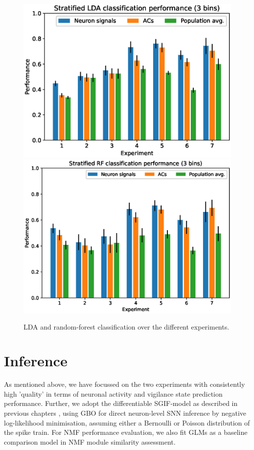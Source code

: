 \documentclass[mphil,deptreport,ianc]{infthesis} %
\begin{document}
\begin{figure}
    \centering
    \includegraphics[width=0.49\columnwidth]{figures/LDA/bars_LDA_per_signal_t_3.eps}
    \includegraphics[width=0.49\columnwidth]{figures/LDA/bars_RF_per_signal_t_3.eps}
    \caption{LDA and random-forest classification over the different experiments.}
    \label{fig:lda_rf_classification}
\end{figure}


\section{Inference}

As mentioned above, we have focussed on the two experiments with consistently high 'quality' in terms of neuronal activity and vigilance state prediction performance.
Further, we adopt the differentiable SGIF-model as described in previous chapters \cite{Rene2020}, using GBO for direct neuron-level SNN inference by negative log-likelihood minimisation, assuming either a Bernoulli or Poisson distribution of the spike train.
For NMF performance evaluation, we also fit GLMs as a baseline comparison model in NMF module similarity assessment.
\end{document}
